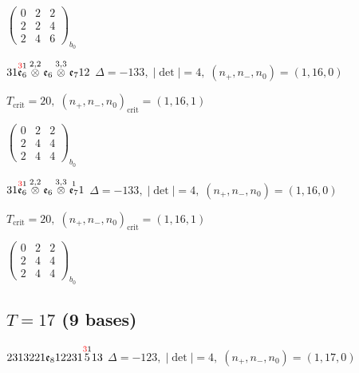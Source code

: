 \documentclass[10pt]{article}
\begin{document}
\hspace{2em}$\left(\begin{smallmatrix}0 & 2 & 2 \\ 2 & 2 & 4 \\ 2 & 4 & 6\end{smallmatrix}\right)_{\!b_0}$

\smallskip

$31\overset{\textcolor{red}{3}1}{\mathfrak{e}_6}\overset{2,2}{\otimes}\mathfrak{e}_6\overset{3,3}{\otimes}\mathfrak{e}_712$ \quad $\Delta=-133,\; |\det|=4,\; (n_+,n_-,n_0)=(1,16,0)$

\hspace{1em}$T_{\text{crit}}=20,\; (n_+,n_-,n_0)_{\text{crit}}=(1,16,1)$

\hspace{2em}$\left(\begin{smallmatrix}0 & 2 & 2 \\ 2 & 4 & 4 \\ 2 & 4 & 4\end{smallmatrix}\right)_{\!b_0}$

\smallskip

$31\overset{\textcolor{red}{3}1}{\mathfrak{e}_6}\overset{2,2}{\otimes}\mathfrak{e}_6\overset{3,3}{\otimes}\overset{1}{\mathfrak{e}_7}1$ \quad $\Delta=-133,\; |\det|=4,\; (n_+,n_-,n_0)=(1,16,0)$

\hspace{1em}$T_{\text{crit}}=20,\; (n_+,n_-,n_0)_{\text{crit}}=(1,16,1)$

\hspace{2em}$\left(\begin{smallmatrix}0 & 2 & 2 \\ 2 & 4 & 4 \\ 2 & 4 & 4\end{smallmatrix}\right)_{\!b_0}$


\subsection*{$T = 17$ \quad (9 bases)}
\smallskip

$2313221\mathfrak{e}_812231\overset{\textcolor{red}{3}1}{5}13$ \quad $\Delta=-123,\; |\det|=4,\; (n_+,n_-,n_0)=(1,17,0)$
\end{document}

